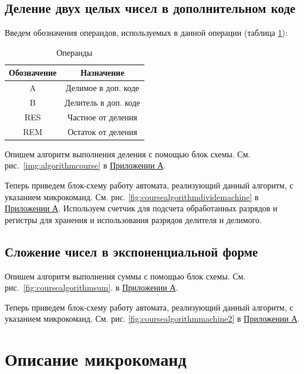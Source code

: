 \documentclass[a4paper,14pt]{extarticle}
\begin{document}
\subsection{Деление двух целых чисел в дополнительном коде}
Введем обозначения операндов, используемых в данной операции (таблица \ref{tab:vars}):
\begin{table}[h!]
	\small
	\centering
	\begin{tabular}{|c|c|}
		\hline
		\multicolumn{1}{|c|}{\textbf{Обозначение}} & \multicolumn{1}{c|}{\textbf{Назначение}} \\ \hline
		A & Делимое в доп. коде \\ \hline
		B & Делитель в доп. коде \\ \hline
		RES & Частное от деления \\ \hline
		REM & Остаток от деления \\ \hline
	\end{tabular}
	\caption{Операнды}
	\label{tab:vars}

\end{table} 

Опишем алгоритм выполнения деления  с помощью блок схемы.  См. рис.~\ref{img:algorithmcourse} в \hyperref[tam]{Приложении А}.


Теперь приведем блок-схему работу автомата, реализующий данный алгоритм, с указанием микрокоманд. См. рис. \ref{fig:coursealgorithmdividemachine} в \hyperref[tam]{Приложении А}. Используем счетчик для подсчета обработанных разрядов и регистры для хранения и использования разрядов делителя и делимого.


\subsection{Сложение чисел в экспоненциальной форме}
Опишем алгоритм выполнения суммы  с помощью блок схемы. См. рис.~\ref{fig:coursealgorithmsum}. в \hyperref[tam]{Приложении А}.

Теперь приведем блок-схему работу автомата, реализующий данный алгоритм, с указанием микрокоманд. См. рис. \ref{fig:coursealgorithmmachine2} в \hyperref[tam]{Приложении А}.

\section{Описание микрокоманд}
\end{document}
